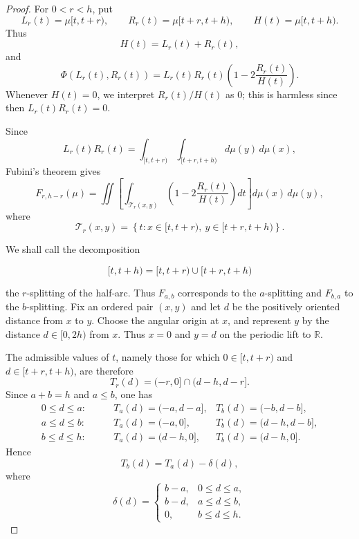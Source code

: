\documentclass[final,12pt]{elsarticle}
\numberwithin{equation}{section}
\theoremstyle{remark}
\theoremstyle{definition}
\begin{document}
\begin{proof}
For $0<r<h$, put
\[
    L_r(t)=\mu[t,t+r),\qquad
    R_r(t)=\mu[t+r,t+h),\qquad
    H(t)=\mu[t,t+h).
\]
Thus
\[
    H(t)=L_r(t)+R_r(t),
\]
and
\[
    \Phi(L_r(t),R_r(t))
    =
    L_r(t)R_r(t)
    \left(
        1-2\frac{R_r(t)}{H(t)}
    \right).
\]
Whenever $H(t)=0$, we interpret $R_r(t)/H(t)$ as $0$; this is
harmless since then $L_r(t)R_r(t)=0$.

Since
\[
    L_r(t)R_r(t)
    =
    \int_{[t,t+r)}
    \int_{[t+r,t+h)}
    d\mu(y)\,d\mu(x),
\]
Fubini's theorem gives
\begin{equation}
\label{eq:block-pair}
    F_{r,h-r}(\mu)
    =
    \iint
    \left[
        \int_{\mathcal T_r(x,y)}
        \left(
            1-2\frac{R_r(t)}{H(t)}
        \right)dt
    \right]
    d\mu(x)\,d\mu(y),
\end{equation}
where
\[
    \mathcal T_r(x,y)
    =
    \left\{
        t:
        x\in[t,t+r),\
        y\in[t+r,t+h)
    \right\}.
\]

We shall call the decomposition

$$ [t,t+h)=[t,t+r)\cup[t+r,t+h) $$

the \(r\)-splitting of the half-arc. Thus \(F_{a,b}\) corresponds to the \(a\)-splitting and \(F_{b,a}\) to the \(b\)-splitting.
Fix an ordered pair $(x,y)$ and let $d$ be the positively oriented distance from $x$ to $y$. Choose the angular origin at \(x\), and represent \(y\) by the distance \(d\in[0,2h)\) from \(x\). Thus \(x=0\) and \(y=d\) on the periodic lift to \(\mathbb R\). 


The admissible values of \(t\), namely those for which \(0\in[t,t+r)\) and \(d\in[t+r,t+h)\), are therefore
\[
    T_r(d)
    =
    (-r,0]\cap(d-h,d-r].
\]
 Since $a+b=h$ and $a\le b$, one has
\[
\begin{aligned}
0\le d\le a:\qquad&
    T_a(d)=(-a,d-a],
    &
    T_b(d)=(-b,d-b],
\\
a\le d\le b:\qquad&
    T_a(d)=(-a,0],
    &
    T_b(d)=(d-h,d-b],
\\
b\le d\le h:\qquad&
    T_a(d)=(d-h,0],
    &
    T_b(d)=(d-h,0].
\end{aligned}
\]
Hence
\begin{equation}
\label{eq:block-translation}
    T_b(d)=T_a(d)-\delta(d),
\end{equation}
where
\[
    \delta(d)=
    \begin{cases}
        b-a, & 0\le d\le a,\\
        b-d, & a\le d\le b,\\
        0,   & b\le d\le h.
    \end{cases}
\]


\end{proof}
\end{document}
